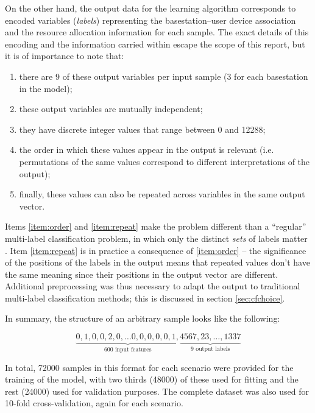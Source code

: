 \documentclass{kthreport}
\theoremstyle{definition}
\begin{document}
On the other hand, the output data for the learning algorithm corresponds to encoded variables (\emph{labels}) representing the basestation--user device association and the resource allocation information for each sample. The exact details of this encoding and the information carried within escape the scope of this report, but it is of importance to note that:
\begin{enumerate}
	\item there are \num{9} of these output variables per input sample (\num{3} for each basestation in the model);
	\item these output variables are mutually independent;
	\item they have discrete integer values that range between \num{0} and \num{12288};
	\item the order in which these values appear in the output is relevant (i.e. permutations of the same values correspond to different interpretations of the output);\label{item:order}
    \item finally, these values can also be repeated across variables in the same output vector.\label{item:repeat}
\end{enumerate} 

Items \ref{item:order} and \ref{item:repeat} make the problem different than a ``regular'' multi-label classification problem, in which only the distinct \emph{sets} of labels matter \autocite{tsoumakas2006multi}. 
Item \ref{item:repeat} is in practice a consequence of \ref{item:order} -- the significance of the positions of the labels in the output means that repeated values don't have the same meaning since their positions in the output vector are different.
Additional preprocessing was thus necessary to adapt the output to traditional multi-label classification methods; this is discussed in section \ref{sec:cfchoice}.

In summary, the structure of an arbitrary sample looks like the following:

\begin{equation}
\underbrace{0, 1, 0, 0, 2, 0, \ldots 0, 0, 0, 0, 0, 1,}_{\text{600 input features}}\underbrace{4567, 23, \ldots , 1337}_{\text{9 output labels}}
\end{equation}

In total, \num{72000} samples in this format for each scenario were provided for the training of the model, with two thirds (\num{48000}) of these used for fitting and the rest (\num{24000}) used for validation purposes. The complete dataset was also used for \num{10}-fold cross-validation, again for each scenario.
\end{document}
